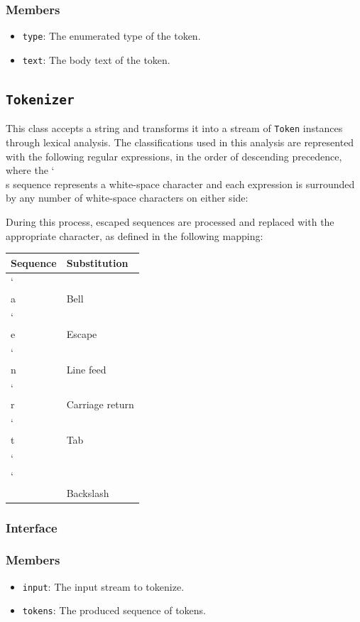 \documentclass{article}
\newcommand{\bslash}{\char`\\}
\begin{document}
  \subsubsection{Members}
  \begin{itemize}
    \item \texttt{type}: The enumerated type of the token.
    \item \texttt{text}: The body text of the token.
  \end{itemize}

  \subsection{\texttt{Tokenizer}}

  This class accepts a string and transforms it into a stream of
  \texttt{Token} instances through lexical analysis.  The
  classifications used in this analysis are represented with the
  following regular expressions, in the order of descending precedence,
  where the \bslash s sequence represents a white-space character and
  each expression is surrounded by any number of white-space characters
  on either side:

  

  During this process, escaped sequences are processed and replaced with
  the appropriate character, as defined in the following mapping:

  \begin{tabular}{l|l}
    Sequence & Substitution \\
    \hline
    \bslash a & Bell \\
    \bslash e & Escape \\
    \bslash n & Line feed \\
    \bslash r & Carriage return \\
    \bslash t & Tab \\
    \bslash \bslash & Backslash
  \end{tabular}

  \subsubsection{Interface}
  

  \subsubsection{Members}
  \begin{itemize}
    \item \texttt{input}: The input stream to tokenize.
    \item \texttt{tokens}: The produced sequence of tokens.
  \end{itemize}
\end{document}

